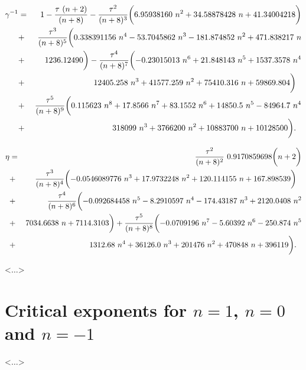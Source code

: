 \documentclass[preprint,preprintnumbers,amsmath,amssymb]{revtex4}
\newcommand{\comment}[1]{} %
\begin{document}
\begin{eqnarray}
\label{gamma-tau}
\gamma^{-1} &=& 1 - {\tau~ (n + 2) \over (n + 8)}
- {\tau^2 \over (n + 8)^3} \biggl( 6.95938160~n^2 + 34.58878428~n + 41.34004218 \biggr)
\nonumber \\
&+& {\tau^3 \over (n + 8)^5} \biggl(0.338391156~n^4 - 53.7045862~n^3 - 181.874852~n^2
+ 471.838217~n
\nonumber \\
&+& 1236.12490 \biggr) - {\tau^4 \over (n + 8)^7} \biggl(- 0.23015013~n^6 + 21.848143~n^5
+ 1537.3578~n^4
\nonumber \\
&+& 12405.258~n^3 + 41577.259~n^2 + 75410.316~n + 59869.804 \biggr) \ \
\nonumber \\
&+& {\tau^5 \over (n + 8)^9} \biggl(0.115623~n^8 + 17.8566~n^7 + 83.1552~n^6 + 14850.5~n^5
- 84964.7~n^4
\nonumber \\
&+& 318099~n^3 + 3766200~n^2 + 10883700~n + 10128500 \biggr). \ \
\end{eqnarray}

\begin{eqnarray}
\label{eta-tau}
\eta &=& {\tau^2 \over (n + 8)^2}~0.9170859698 \biggl(n + 2 \biggr)
\nonumber \\
&+& {\tau^3 \over (n + 8)^4} \biggl(- 0.0546089776~n^3 + 17.9732248~n^2 + 120.114155~n
+ 167.898539 \biggr) \ \
\nonumber \\
&+& {\tau^4 \over (n + 8)^6} \biggl(- 0.092684458~n^5 - 8.2910597~n^4 - 174.43187~n^3
+ 2120.0408~n^2
\nonumber \\
&+& 7034.6638~n + 7114.3103 \biggr) + {\tau^5 \over (n + 8)^8} \biggl(- 0.0709196~n^7
- 5.60392~n^6 - 250.874~n^5
\nonumber \\
&+& 1312.68~n^4 + 36126.0~n^3 + 201476~n^2 + 470848~n + 396119 \biggr). \ \
\end{eqnarray}


<$\dots$>
\comment{
Pseudo-$\epsilon$ expansions for other critical exponents can be deduced from (4), (5)
using well-known scaling relations. The series for the correlation length exponent
$\nu$, for example, results from the formula
\begin{equation}
\label{scaling}
\gamma = \nu (2 - \eta).
\end{equation}
}

\section{Critical exponents for $n=1$, $n=0$ and $n =-1$}

<$\dots$>
\comment{
It is of major interest to analyze numerical results given by the
obtained expansions for the values of $n$ under which the model
(1) describes physically realizable systems and is exactly
solvable. That is why further we concentrate on the cases $n=1$,
$n=0$, and $n =-1$. Pseudo-$\epsilon$ expansions for critical
exponents we'll deal with are as follows:
}
\end{document}
